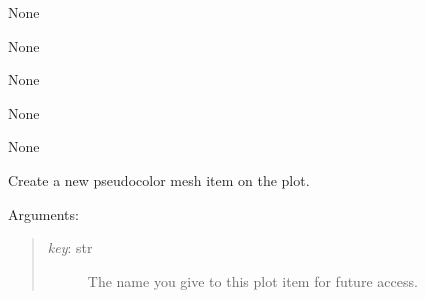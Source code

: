\documentclass[letterpaper,10pt,english]{sphinxmanual}
\begin{document}
\begin{fulllineitems}
\begin{fulllineitems}
\end{fulllineitems}


\begin{fulllineitems}
\label{api:mpl.Plot2D.figure_enter_action}
None

\end{fulllineitems}


\begin{fulllineitems}
\label{api:mpl.Plot2D.figure_leave_action}
None

\end{fulllineitems}


\begin{fulllineitems}
\label{api:mpl.Plot2D.key_press_action}
None

\end{fulllineitems}


\begin{fulllineitems}
\label{api:mpl.Plot2D.key_release_action}
None

\end{fulllineitems}


\begin{fulllineitems}
\label{api:mpl.Plot2D.motion_notify_action}
None

\end{fulllineitems}


\begin{fulllineitems}
\label{api:mpl.Plot2D.new_colormesh}
Create a new pseudocolor mesh item on the plot.

Arguments:
\begin{quote}
\begin{description}
\item[{\emph{key}: str}] \leavevmode
The name you give to this plot item for future access.


\end{description}
\end{quote}
\end{fulllineitems}
\end{fulllineitems}
\end{document}

